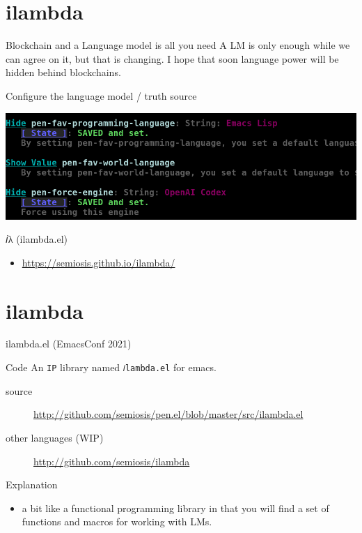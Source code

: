 \documentclass[presentation]{beamer}
\begin{document}
\section{ilambda}
\label{sec:org37f4bf3}
\begin{frame}[label={sec:org103e205}]{Blockchain and a Language model is all you need}
A LM is only enough while we can agree on it,
but that is changing. I hope that soon
language power will be hidden behind
blockchains.

\begin{block}{Configure the language model / truth source}
\begin{center}
\includegraphics[width=.9\linewidth]{./configure-model.png}
\end{center}
\end{block}

\begin{block}{𝑖λ (ilambda.el)}
\begin{itemize}
\item \url{https://semiosis.github.io/ilambda/}
\end{itemize}
\end{block}
\end{frame}

\section{ilambda}
\label{sec:org52842af}
\begin{frame}[label={sec:org801775c},fragile]{ilambda.el (EmacsConf 2021)}
 \begin{block}{Code}
An \texttt{IP} library named \texttt{𝑖lambda.el} for emacs.

\begin{description}
\item[{source}] \url{http://github.com/semiosis/pen.el/blob/master/src/ilambda.el}
\item[{other languages (WIP)}] \url{http://github.com/semiosis/ilambda}
\end{description}
\end{block}

\begin{block}{Explanation}
\begin{itemize}
\item a bit like a functional programming library
in that you will find a set of functions and
macros for working with LMs.
\end{itemize}
\end{block}
\end{frame}
\end{document}
